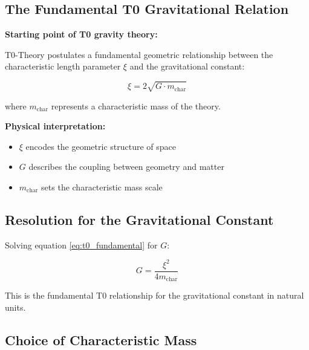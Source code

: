 \documentclass[12pt,a4paper]{article}
\begin{document}
	\subsection{The Fundamental T0 Gravitational Relation}
	
	\begin{derivation}
		\textbf{Starting point of T0 gravity theory:}
		
		T0-Theory postulates a fundamental geometric relationship between the characteristic length parameter $\xi$ and the gravitational constant:
		
		\begin{equation}
			\xi = 2\sqrt{G \cdot m_{\text{char}}}
			\label{eq:t0_fundamental}
		\end{equation}
		
		where $m_{\text{char}}$ represents a characteristic mass of the theory.
		
		\textbf{Physical interpretation:}
		\begin{itemize}
			\item $\xi$ encodes the geometric structure of space
			\item $G$ describes the coupling between geometry and matter
			\item $m_{\text{char}}$ sets the characteristic mass scale
		\end{itemize}
	\end{derivation}
	
	\subsection{Resolution for the Gravitational Constant}
	
	Solving equation \eqref{eq:t0_fundamental} for $G$:
	
	\begin{equation}
		\boxed{G = \frac{\xi^2}{4 m_{\text{char}}}}
		\label{eq:g_fundamental}
	\end{equation}
	
	This is the fundamental T0 relationship for the gravitational constant in natural units.
	
	\subsection{Choice of Characteristic Mass}
	
\end{document}
